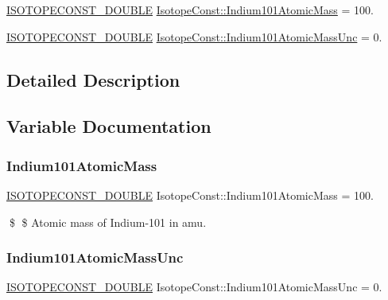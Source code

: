 \begin{DoxyCompactItemize}
\item 
\mbox{\hyperlink{group___isotope_const-_macros_ga8f45a7272ce02c0b4c65c44636ed719a}{I\+S\+O\+T\+O\+P\+E\+C\+O\+N\+S\+T\+\_\+\+D\+O\+U\+B\+LE}} \mbox{\hyperlink{group___isotope_const-_indium-_in101_gacab4e651e94d5833b41eedda774d29f7}{Isotope\+Const\+::\+Indium101\+Atomic\+Mass}} = 100.
\item 
\mbox{\hyperlink{group___isotope_const-_macros_ga8f45a7272ce02c0b4c65c44636ed719a}{I\+S\+O\+T\+O\+P\+E\+C\+O\+N\+S\+T\+\_\+\+D\+O\+U\+B\+LE}} \mbox{\hyperlink{group___isotope_const-_indium-_in101_ga45c95f90ba539fff317e751a45d580fd}{Isotope\+Const\+::\+Indium101\+Atomic\+Mass\+Unc}} = 0.
\end{DoxyCompactItemize}


\subsection{Detailed Description}


\subsection{Variable Documentation}
\mbox{\label{group___isotope_const-_indium-_in101_gacab4e651e94d5833b41eedda774d29f7}} 
\subsubsection{\texorpdfstring{Indium101\+Atomic\+Mass}{Indium101AtomicMass}}
{\footnotesize\ttfamily \mbox{\hyperlink{group___isotope_const-_macros_ga8f45a7272ce02c0b4c65c44636ed719a}{I\+S\+O\+T\+O\+P\+E\+C\+O\+N\+S\+T\+\_\+\+D\+O\+U\+B\+LE}} Isotope\+Const\+::\+Indium101\+Atomic\+Mass = 100.}

\$ \$ Atomic mass of Indium-\/101 in amu. \mbox{\label{group___isotope_const-_indium-_in101_ga45c95f90ba539fff317e751a45d580fd}} 
\subsubsection{\texorpdfstring{Indium101\+Atomic\+Mass\+Unc}{Indium101AtomicMassUnc}}
{\footnotesize\ttfamily \mbox{\hyperlink{group___isotope_const-_macros_ga8f45a7272ce02c0b4c65c44636ed719a}{I\+S\+O\+T\+O\+P\+E\+C\+O\+N\+S\+T\+\_\+\+D\+O\+U\+B\+LE}} Isotope\+Const\+::\+Indium101\+Atomic\+Mass\+Unc = 0.}


